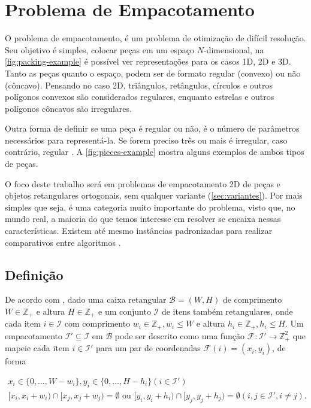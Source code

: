 \chapter{Problema de Empacotamento}\label{ch:problema-de-empacotamento}

O problema de empacotamento, é um problema de otimização de difícil resolução.
Seu objetivo é simples, colocar peças em um espaço $N$-dimensional, na \autoref{fig:packing-example} é possível ver representações para os casos 1D, 2D e 3D.
Tanto as peças quanto o espaço, podem ser de formato regular (convexo) ou não (côncavo).
Pensando no caso 2D, triângulos, retângulos, círculos e outros polígonos convexos são considerados regulares, enquanto estrelas e outros polígonos côncavos são irregulares.

Outra forma de definir se uma peça é regular ou não, é o número de parâmetros necessários para representá-la.
Se forem preciso três ou mais é irregular, caso contrário, regular \cite{aprendizado-reforco}.
A \autoref{fig:pieces-example} mostra alguns exemplos de ambos tipos de peças.

O foco deste trabalho será em problemas de empacotamento 2D de peças e objetos retangulares ortogonais, sem qualquer variante (\autoref{sec:variantes}).
Por mais simples que seja, é uma categoria muito importante do problema, visto que, no mundo real, a maioria do que temos interesse em resolver se encaixa nessas características.
Existem até mesmo instâncias padronizadas para realizar comparativos entre algoritmos \cite{2DPackLib}.




\section{Definição}\label{sec:definicao}

De acordo com \cite{2DPackLib}, dado uma caixa retangular $\mathcal{B} = (W, H)$ de comprimento $W \in \mathbb{Z}_+$ e altura $H \in \mathbb{Z}_+$ e um conjunto $\mathcal{I}$ de itens também retangulares, onde cada item $i \in \mathcal{I}$ com comprimento $w_i \in \mathbb{Z}_+, w_i \le W$ e altura $h_i \in \mathbb{Z}_+, h_i \le H$.
Um empacotamento $\mathcal{I}' \subseteq \mathcal{I}$ em $\mathcal{B}$ pode ser descrito como uma função $\mathcal{F}: \mathcal{I}' \to \mathbb{Z}_+^2$ que mapeie cada item $i \in \mathcal{I}'$ para um par de coordenadas $\mathcal{F}(i) = (x_i, y_i)$, de forma

\begin{align}
    x_i \in \{0, \dots, W - w_i\}, y_i \in \{0, \dots, H - h_i\} \left(i \in \mathcal{I}'\right) \label{eq:1} \\
    [x_i, x_i + w_i) \cap [x_j, x_j + w_j) = \emptyset \text{ ou } [y_i, y_i + h_i) \cap [y_j, y_j + h_j) = \emptyset \left(i, j \in \mathcal{I}', i \neq j\right) \label{eq:2}.
\end{align}

